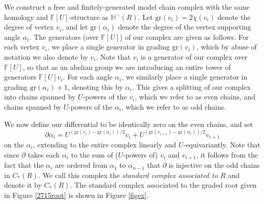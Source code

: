 \documentclass[11 pt]{amsart}
\theoremstyle{remark}
\def\gr{\mathrm{gr}}
\def\ff {{\mathbb{F}}}
\def\He{\mathbb{H}}
\begin{document}
We construct a free and finitely-generated model chain complex with the same homology and $\ff[U]$-structure as $\He^-(R)$. Let $\gr(v_i) = 2\chi(v_i)$ denote the degree of vertex $v_i$, and let $\gr(\alpha_i)$ denote the degree of the vertex supporting angle $\alpha_i$. The generators (over $\ff[U]$) of our complex are given as follows. For each vertex $v_i$, we place a single generator in grading $\gr(v_i)$, which by abuse of notation we also denote by $v_i$. Note that $v_i$ is a generator of our complex over $\ff[U]$, so that as an abelian group we are introducing an entire tower of generators $\ff[U]v_i$. For each angle $\alpha_i$, we similarly place a single generator in grading $\gr(\alpha_i) + 1$, denoting this by $\alpha_i$. This gives a splitting of our complex into chains spanned by $U$-powers of the $v_i$, which we refer to as even chains, and chains spanned by $U$-powers of the $\alpha_i$, which we refer to as odd chains. 

We now define our differential to be identically zero on the even chains, and set
\[
\partial \alpha_i = U^{(\gr(v_i)-\gr(\alpha_i))/2}v_i + U^{(\gr(v_{i+1})-\gr(\alpha_i))/2}v_{i+1}
\]
on the $\alpha_i$, extending to the entire complex linearly and $U$-equivariantly. Note that since $\partial$ takes each $\alpha_i$ to the sum of ($U$-powers of) $v_i$ and $v_{i+1}$, it follows from the fact that the $\alpha_i$ are ordered from $\alpha_1$ to $\alpha_{n-1}$ that $\partial$ is injective on the odd chains in $C_*(R)$. We call this complex the \textit{standard complex associated to $R$} and denote it by $C_*(R)$. The standard complex associated to the graded root given in Figure \ref{2715root} is shown in Figure \ref{figex}. 
\end{document}
